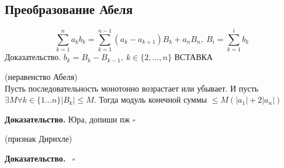 \subsection{Преобразование Абеля}
$$\sum\limits_{k=1}^{n} a_k b_k=\sum\limits_{k=1}^{n-1} (a_k-a_{k+1})B_k
+a_nB_n,~B_i=\sum\limits_{k=1}^{i} b_k$$ 
Доказательство. $b_k=B_{k}-B_{k-1},~k\in \{2,...,n\} $ ВСТАВКА

\begin{theor}
    (неравенство Абеля)\\
    Пусть последовательность монотонно возрастает или убывает. 
    И пусть $\exists M\forall k\in \{1...n\}|B_k|\leqslant M $.
    Тогда модуль конечной суммы $\leqslant M(|a_1|+2|a_n|)$ 
\end{theor}
\textbf{Доказательство.} Юра, допиши пж 
$\square$ 
\begin{theor}
    (признак Дирихле)


\end{theor}
\textbf{Доказательство.}  \
$\square$ 











